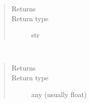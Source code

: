 \documentclass[letterpaper,10pt,english]{sphinxmanual}
\begin{document}
\begin{fulllineitems}
\begin{fulllineitems}
\begin{quote}
\begin{description}
\item[{Returns}] \leavevmode
{}

\item[{Return type}] \leavevmode
str

\end{description}\end{quote}

\end{fulllineitems}


\begin{fulllineitems}
\label{\detokenize{Reference:salabim.Distribution.sample}}~\begin{quote}\begin{description}
\item[{Returns}] \leavevmode
{}

\item[{Return type}] \leavevmode
any (usually float)

\end{description}\end{quote}

\end{fulllineitems}


\end{fulllineitems}

\end{document}
